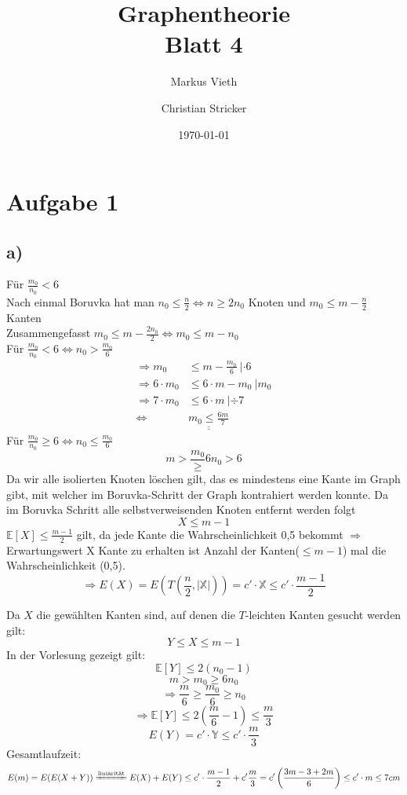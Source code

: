 \documentclass[a4paper,11pt,twoside]{scrartcl}
\title{Graphentheorie\\ Blatt 4}
\author{Markus Vieth\and Christian Stricker}
\date{\today}
\begin{document}
\maketitle
\cleardoublepage
\pagestyle{myheadings}

\newpage
\section*{Aufgabe 1}
\subsection*{a)}
Für $\frac{m_0}{n_0}<6$ \\
Nach einmal Boruvka hat man $n_0\leq \frac{n}{2}\Leftrightarrow n \geq2n_0 $ Knoten und $m_0 \leq m- \frac{n}{2} $ Kanten \\
Zusammengefasst $m_0 \leq m- \frac{2n_0}{2} \Leftrightarrow m_0 \leq m-n_0 $ \\

Für $\frac{m_0}{n_0} <6 \Leftrightarrow n_0 >\frac{m_0}{6}$\\
\begin{align*}
\Rightarrow m_0&\leq m-\frac{m_0}{6} ~ |\cdot 6\\
\Rightarrow 6\cdot m_0&\leq 6\cdot m-m_0 ~ |m_0\\
\Rightarrow 7\cdot m_0&\leq 6\cdot m ~ | \div 7\\
\Leftrightarrow&\underline{\underline{m_0\leq \frac{6m}{7}}}
\end{align*}
Für $\frac{m_0}{n_0} \geq6 \Leftrightarrow n_0 \leq \frac{m_0}{6} $ \\
\[ m > \frac{m_0}\geq 6n_0 > 6\]
Da wir alle isolierten Knoten löschen gilt, das es mindestens eine Kante im Graph gibt, mit welcher im Boruvka-Schritt der Graph kontrahiert werden konnte. Da im Boruvka Schritt alle selbstverweisenden Knoten entfernt werden folgt
\[ X \leq m-1 \]
$\mathbb{E}[X] \leq \frac{m-1}{2}$ gilt, da jede Kante die Wahrscheinlichkeit 0,5 bekommt $\Rightarrow$ Erwartungswert X Kante zu erhalten ist Anzahl der Kanten($\leq m-1$) mal die Wahrscheinlichkeit (0,5).
\[ \Rightarrow E(X) = E(T(\frac{n}{2}, |\mathbb{X}|)) = c'\cdot\mathbb{X} \leq c'\cdot\frac{m-1}{2} \]


Da $X$ die gewählten Kanten sind, auf denen die $T$-leichten Kanten gesucht werden gilt:
\[ Y\leq X\leq m-1\]
In der Vorlesung gezeigt gilt:
\[ \mathbb{E}[Y] \leq 2(n_0 -1) \]
\[ m > m_0\geq 6n_0\]
\[\Rightarrow \frac{m}{6} \geq \frac{m_0}{6}\geq n_0\]
\[\Rightarrow \mathbb{E}[Y] \leq  2\left( \frac{m}{6} -1\right) \leq \frac{m}{3}  \]
\[ E(Y) = c'\cdot\mathbb{Y} \leq c'\cdot\frac{m}{3} \]
Gesamtlaufzeit:
\[ E(m) = E(E(X+Y)) \xlongequal{\!\text{liniarität}\!} E(X)+E(Y) \leq c'\cdot\frac{m-1}{2} + c'\frac{m}{3} = c'\left( \frac{3m - 3 + 2m}{6} \right) \leq c'\cdot m \leq 7cm  \]
\end{document}
